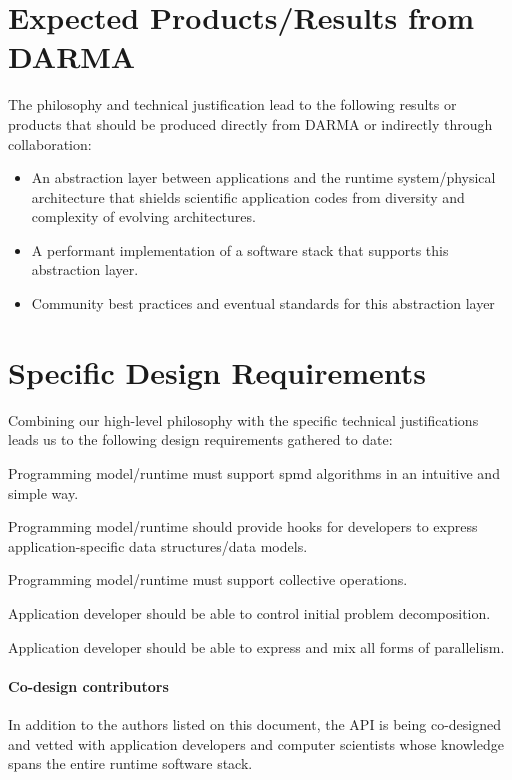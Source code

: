 \section{Expected Products/Results from DARMA}
The philosophy and technical justification lead to the following results or products that should be produced directly from DARMA or indirectly through collaboration:
\begin{itemize}
\item An abstraction layer between applications and the
runtime system/physical architecture that shields scientific application codes
from diversity and complexity of evolving architectures.
\item A performant implementation of a software stack that supports this
abstraction layer.
\item Community best practices and eventual standards for this abstraction
layer
\end{itemize}

\section{Specific Design Requirements}
Combining our high-level philosophy with the specific technical justifications leads us to the following design requirements gathered to date:
\begin{compactitem}
\item Programming model/runtime must support \gls{spmd} algorithms in an intuitive and simple way.
\item Programming model/runtime should provide hooks for developers to express application-specific data structures/data models.
\item Programming model/runtime must support collective operations.
\item Application developer should be able to control initial problem decomposition.
\item Application developer should be able to express and mix all forms of
parallelism.
\end{compactitem}


\paragraph{Co-design contributors}
In addition to the authors listed on this document,
the \gls{API} is being \gls{co-design}ed and vetted with application developers
and computer scientists whose knowledge spans the entire runtime software stack.


